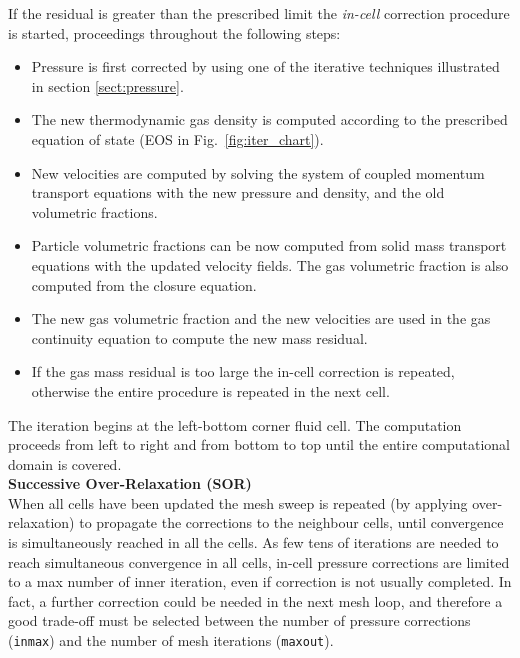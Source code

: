 If the residual is greater than the prescribed limit the {\em in-cell} correction procedure
is started, proceedings throughout the following steps:
\begin{itemize}
\item Pressure is first corrected by using one of the iterative techniques illustrated in section 
\ref{sect:pressure}. 
\item The new thermodynamic gas density is computed according to the prescribed
equation of state (EOS in Fig.~\ref{fig:iter_chart}). 
\item New velocities are computed by solving the system of coupled momentum transport 
equations with the new pressure and density, and the old volumetric fractions. 
\item Particle volumetric fractions can be now computed from solid mass transport 
equations with the updated velocity fields. The gas volumetric fraction is also computed 
from the closure equation.
\item The new gas volumetric fraction and the new velocities are used in the gas 
continuity  equation to compute the new mass residual.
\item If the gas mass residual is too large the in-cell correction is repeated, otherwise
the entire procedure is repeated in the next cell.
\end{itemize}
The iteration begins at the left-bottom corner fluid cell. The computation proceeds 
from left to right and from bottom to top until the entire computational domain is covered.\\

{\bf Successive Over-Relaxation (SOR)}\\
When all cells have been updated the mesh sweep is repeated (by applying over-relaxation)
to propagate the corrections to the neighbour cells, until convergence is simultaneously reached
in all the cells. 
As few tens of iterations are needed to reach simultaneous convergence
in all cells, in-cell pressure corrections are limited to a max number of inner iteration,
even if correction is not usually completed. In fact, a further correction could be needed in the next 
mesh loop, and therefore a good trade-off must be selected between the number of pressure corrections
({\tt inmax}) and the number of mesh iterations ({\tt maxout}).\\
%
